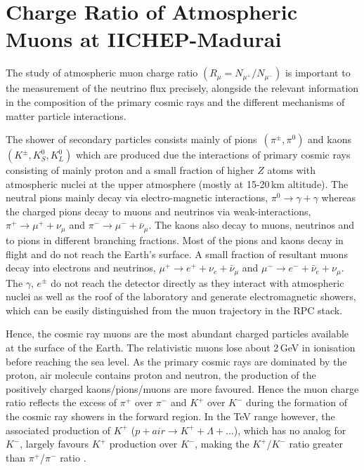 
\chapter{Charge Ratio of Atmospheric Muons at IICHEP-Madurai}

The study of atmospheric muon charge ratio
$\left(R_{\mu}=N_{\mu^{+}}/N_{\mu^{-}}\right)$
is important to the measurement of the neutrino flux precisely,
alongside the relevant information in the composition of the primary
cosmic rays and the different mechanisms of matter particle
interactions.

The shower of secondary particles consists mainly of
\mbox{pions $\left(\pi^{\pm}, \pi^0\right)$} and
\mbox{kaons $\left(K^{\pm}, K^0_S, K^0_L\right)$} which are produced due
the interactions of primary cosmic rays consisting of mainly proton
and a small fraction of higher $Z$ atoms \cite{cosmic1,pdgspectra1}
with atmospheric nuclei at the upper atmosphere (mostly at 15-20\,km
altitude).
The neutral pions mainly decay via electro-magnetic interactions,
$\pi^0 \rightarrow \gamma+\gamma$ whereas the charged pions decay to
muons and neutrinos via weak-interactions,
$\pi^+ \rightarrow \mu^+ + \nu_{\mu}$ and
$\pi^- \rightarrow \mu^- + \bar{\nu}_{\mu}$. The kaons also decay to
muons, neutrinos and to pions in different branching fractions.
Most of the pions and kaons decay in flight and do not reach the
Earth's surface.
A small fraction of resultant muons decay into electrons and neutrinos,
$\mu^+ \rightarrow e^+ + \nu_{e} + \bar{\nu}_{\mu}$ and
$\mu^- \rightarrow e^- + \bar{\nu}_{e} + \nu_{\mu}$.
The $\gamma$, $e^{\pm}$ do not reach the detector directly as they
interact with atmospheric nuclei as well as the roof of the laboratory
and generate electromagnetic showers, which can be easily distinguished
from the muon trajectory in the RPC stack.

Hence, the cosmic ray muons are the most abundant charged particles
available at the surface of the Earth. The relativistic muons lose
about 2\,GeV in ionisation before reaching the sea level.
As the primary cosmic rays are dominated by the proton, air molecule
  contains proton and neutron, the production of the positively
  charged kaons/pions/muons are more favoured.
Hence the muon charge ratio reflects the excess of $\pi^{+}$ over
$\pi^{-}$ and $K^{+}$ over $K^{-}$ during the formation of the
cosmic ray showers in the forward region. In the TeV range however,
the associated production of $K^{+}$
($p+air \rightarrow K^{+} + \Lambda + ...$), which has no analog for $K^{-}$,
largely favours $K^{+}$ production over $K^{-}$, making the
$K^{+}$/$K^{-}$ ratio greater than $\pi^{+}$/$\pi^{-}$ ratio
\cite{adamson2007}.


